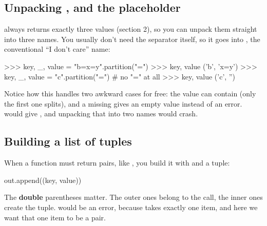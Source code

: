 \documentclass[10pt,a4paper]{article}
\begin{document}
\subsection{Unpacking , and the \code{\_} placeholder}
 always returns exactly three values (section 2), so you can unpack them straight into three names. You usually don’t need the separator itself, so it goes into \code{\_}, the conventional “I don’t care” name:
\begin{txtcode}
>>> key, _, value = "b=x=y".partition("=")
>>> key, value
('b', 'x=y')
>>> key, _, value = "c".partition("=")      # no "=" at all
>>> key, value
('c', '')
\end{txtcode}
Notice how this handles two awkward cases for free: the value can contain \code{=\allowbreak{}} (only the first one splits), and a missing \code{=\allowbreak{}} gives an empty value instead of an error.  would give \code{['c']}, and unpacking that into two names would crash.
\subsection{Building a list of tuples}
When a function must return pairs, like \code{[(\allowbreak{}\textquotedbl{}a\textquotedbl{},\allowbreak{}\ \textquotedbl{}1\textquotedbl{})\allowbreak{},\allowbreak{}\ (\allowbreak{}\textquotedbl{}b\textquotedbl{},\allowbreak{}\ \textquotedbl{}x=\allowbreak{}y\textquotedbl{})\allowbreak{}]}, you build it with  and a tuple:
\begin{pycode}
out.append((key, value))
\end{pycode}
The \textbf{double} parentheses matter. The outer ones belong to the  call, the inner ones create the tuple.  would be an error, because  takes exactly one item, and here we want that one item to be a pair.
\end{document}
